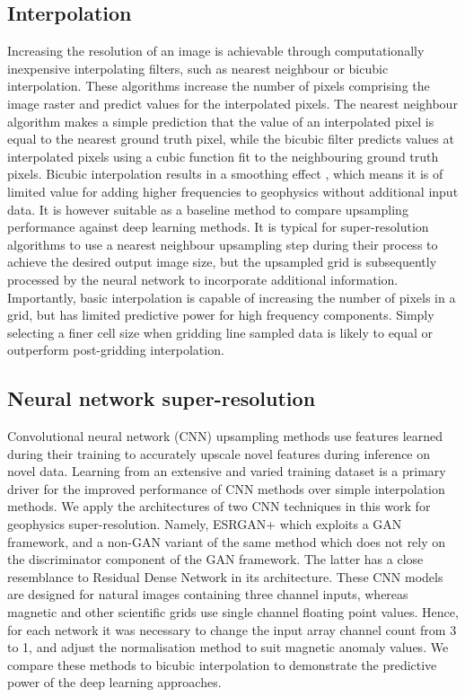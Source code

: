 \documentclass[manuscript.tex]{subfiles}
\begin{document}
\subsection{Interpolation}
Increasing the resolution of an image is achievable through computationally inexpensive interpolating filters, such as nearest neighbour or bicubic interpolation.
These algorithms increase the number of pixels comprising the image raster and predict values for the interpolated pixels.
The nearest neighbour algorithm makes a simple prediction that the value of an interpolated pixel is equal to the nearest ground truth pixel, while the bicubic filter predicts values at interpolated pixels using a cubic function fit to the neighbouring ground truth pixels.
Bicubic interpolation results in a smoothing effect \parencite{keysCubicConvolutionInterpolation1981}, which means it is of limited value for adding higher frequencies to geophysics without additional input data.
It is however suitable as a baseline method to compare upsampling performance against deep learning methods.
It is typical for super-resolution algorithms to use a nearest neighbour upsampling step during their process to achieve the desired output image size, but the upsampled grid is subsequently processed by the neural network to incorporate additional information.
Importantly, basic interpolation is capable of increasing the number of pixels in a grid, but has limited predictive power for high frequency components.
Simply selecting a finer cell size when gridding line sampled data is likely to equal or outperform post-gridding interpolation.

\subsection{Neural network super-resolution}
\label{sec:nnsr}
Convolutional neural network (CNN) upsampling methods use features learned during their training to accurately upscale novel features during inference on novel data.
Learning from an extensive and varied training dataset is a primary driver for the improved performance of CNN methods over simple interpolation methods.
We apply the architectures of two CNN techniques in this work for geophysics super-resolution.
Namely, ESRGAN+ \parencite{rakotonirinaESRGANFurtherImproving2020} which exploits a GAN framework, and a non-GAN variant of the same method which does not rely on the discriminator component of the GAN framework.
The latter has a close resemblance to Residual Dense Network \parencite{zhangResidualDenseNetwork2018} in its architecture.
These CNN models are designed for natural images containing three channel inputs, whereas magnetic and other scientific grids use single channel floating point values.
Hence, for each network it was necessary to change the input array channel count from 3 to 1, and adjust the normalisation method to suit magnetic anomaly values.
We compare these methods to bicubic interpolation to demonstrate the predictive power of the deep learning approaches.
\end{document}
